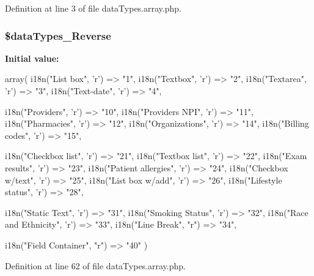 \-Definition at line 3 of file data\-Types.\-array.\-php.

\hypertarget{data_types_8array_8php_a38cbc2a1218bc7aeefb5ca532fc6f22d}{
\subsubsection[{\$data\-Types\-\_\-\-Reverse}]{\setlength{\rightskip}{0pt plus 5cm}\$data\-Types\-\_\-\-Reverse}}\label{data_types_8array_8php_a38cbc2a1218bc7aeefb5ca532fc6f22d}
{\bfseries \-Initial value\-:}
\begin{DoxyCode}
 array(
        i18n("List box", 'r')                   => "1", 
        i18n("Textbox", 'r')                    => "2",
        i18n("Textarea", 'r')                   => "3",
        i18n("Text-date", 'r')                  => "4",
        
        i18n("Providers", 'r')                  => "10",
        i18n("Providers NPI", 'r')              => "11",
        i18n("Pharmacies", 'r')                 => "12",
        i18n("Organizations", 'r')              => "14",
        i18n("Billing codes", 'r')              => "15",
        
        i18n("Checkbox list", 'r')              => "21",
        i18n("Textbox list", 'r')               => "22",
        i18n("Exam results", 'r')               => "23",
        i18n("Patient allergies", 'r')  => "24",
        i18n("Checkbox w/text", 'r')    => "25",
        i18n("List box w/add", 'r')     => "26",
        i18n("Lifestyle status", 'r')   => "28",
        
        i18n("Static Text", 'r')                => "31",
        i18n("Smoking Status", 'r')     => "32",
        i18n("Race and Ethnicity", 'r') => "33",
        i18n("Line Break", "r")                 => "34",
        
        i18n("Field Container", "r") => "40"
)
\end{DoxyCode}


\-Definition at line 62 of file data\-Types.\-array.\-php.

